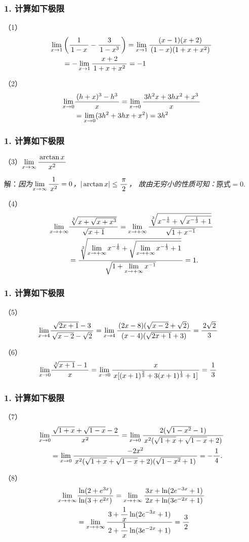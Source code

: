 \begin{frame}[t]\frametitle{1. 计算如下极限}
\large
（1）
\begin{align*}
	\limx{1}&\left(\df1{1-x}-\df3{1-x^3}\right)
	=\limx1\df{(x-1)(x+2)}{(1-x)(1+x+x^2)}\\
	&=-\limx1\df{x+2}{1+x+x^2}=-1
\end{align*}

（2）
\begin{align*}
	\limx0&\df{(h+x)^3-h^3}x
	=\limx0\df{3h^2x+3hx^2+x^3}{x}\\
	&=\limx0(3h^2+3hx+x^2)=3h^2
\end{align*}
\end{frame}

\begin{frame}[t]\frametitle{1. 计算如下极限}
\large
（3）$\limx{\infty}\df{\arctan x}{x^2}$

解：{\it 因为$\limx{\infty}\df1{x^2}=0$，$|\arctan x|\leq\df{\pi}2$，
故由无穷小的性质可知：$\mbox{原式}=0.$}

\bs
（4）
\begin{align*}
	\limx{+\infty}&\df{\sqrt[3]{x+\sqrt{x+x^3}}}{\sqrt{x+1}}
	=\limx{+\infty}\df{\sqrt[3]{x^{-\frac16}
	+\sqrt{x^{-\frac13}+1}}}{\sqrt{1+x^{-1}}}\\
	&=\df{\sqrt[3]{\limx{+\infty}x^{-\frac16}
	+\sqrt{\limx{+\infty}x^{-\frac13}+1}}}{\sqrt{1+\limx{+\infty}x^{-1}}}=1.
\end{align*}
\end{frame}

\begin{frame}[t]\frametitle{1. 计算如下极限}
\large
（5）
\begin{align*}
	\limx4&\df{\sqrt{2x+1}-3}{\sqrt{x-2}-\sqrt2}
	=\limx4\df{(2x-8)(\sqrt{x-2}+\sqrt2)}{(x-4)(\sqrt{2x+1}+3)}
	=\df{2\sqrt2}3
\end{align*}

（6）
\begin{align*}
	\limx0&\df{\sqrt[3]{x+1}-1}x
	=\limx0\df{x}{x[(x+1)^{\frac{2}{3}}
	+3(x+1)^{\frac{1}{3}}+1]}
	=\df13
\end{align*}
\end{frame}

\begin{frame}[t]\frametitle{1. 计算如下极限}
\large
（7）
\begin{align*}
	\limx0&\df{\sqrt{1+x}+\sqrt{1-x}-2}{x^2}
	=\limx0\df{2(\sqrt{1-x^2}-1)}
	{x^2(\sqrt{1+x}+\sqrt{1-x}+2)}\\
	&=\limx0\df{-2x^2}{x^2(\sqrt{1+x}+\sqrt{1-x}+2)
	(\sqrt{1-x^2}+1)}=-\df14.
\end{align*}

（8）
\begin{align*}
	\limx{+\infty}&\df{\ln(2+e^{3x})}{\ln(3+e^{2x})}
	=\limx{+\infty}
	\df{3x+\ln(2e^{-3x}+1)}{2x+\ln(3e^{-2x}+1)}\\
	&=\limx{+\infty}
	\df{3+\df1x\ln(2e^{-3x}+1)}{2+\df1x\ln(3e^{-2x}+1)}
	=\df32
\end{align*}
\end{frame}

